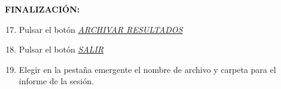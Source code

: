 		\hspace{1cm}\textbf{FINALIZACIÓN:}
	\begin{enumerate}
		\setcounter{enumi}{16}
		\item Pulsar el botón \underline{\textit{ARCHIVAR RESULTADOS}}
		\item Pulsar el botón \underline{\textit{SALIR}}
		\item Elegir en la pestaña emergente el nombre de archivo y carpeta para el informe de la sesión.
	\end{enumerate}


